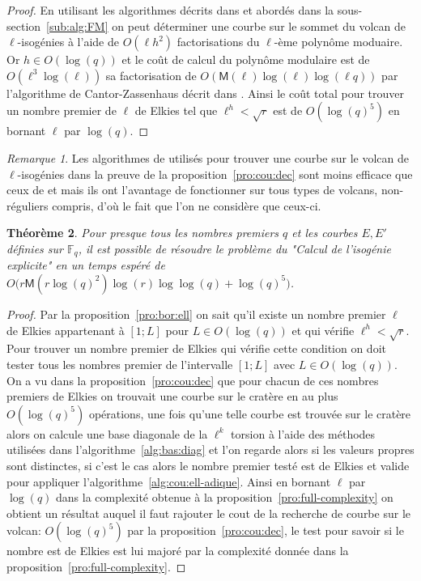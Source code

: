 \documentclass[10pt,a4paper]{book}
\theoremstyle{plain}
\newtheorem{thm}{Théorème}[chapter]
\theoremstyle{definition}
\theoremstyle{definition}
\theoremstyle{definition}
\theoremstyle{definition}
\theoremstyle{remark}
\newtheorem{rem}[thm]{Remarque}
\theoremstyle{remark}
\theoremstyle{definition}
\begin{document}
\begin{proof}
En utilisant les algorithmes décrits dans \cite{FouquetMorain02} et abordés 
dans la sous-section~\ref{sub:alg:FM} on peut déterminer une courbe sur le 
sommet du volcan de $\ell$-isogénies à l'aide de $O(\ell h^2)$ 
  factorisations du $\ell$-ème polynôme moduaire. Or $h \in O(\log(q))$ et
  le coût de calcul du polynôme modulaire est de $O(\ell^3\log(\ell))$ sa factorisation de 
  $O(\mathsf{M}(\ell)\log(\ell)\log(\ell q))$ par l'algorithme de 
  Cantor-Zassenhaus décrit dans \cite[Chapter~14.5]{vzGJG03}. Ainsi le coût 
  total pour trouver un nombre premier de $\ell$ de Elkies tel que $\ell^h<\sqrt{r}$  est de
  $O(\log(q)^5)$ en bornant $\ell$ par $\log(q)$.
	
\end{proof}

\begin{rem}
Les algorithmes de \cite{FouquetMorain02} utilisés pour trouver une courbe sur 
le volcan de $\ell$-isogénies  dans la preuve de la 
proposition~\ref{pro:cou:dec} sont moins efficace que ceux de 
\cite{Ionica-Joux10} et \cite{MiretMRV05} mais ils ont l'avantage de 
fonctionner sur tous types de volcans, non-réguliers compris, d'où le fait que
l'on ne considère que ceux-ci.
\end{rem}


\begin{thm}
Pour presque tous les nombres premiers $q$ et les courbes $E,E'$ définies sur 
$\mathbb{F}_q$, il est possible de résoudre le problème du "Calcul de l'isogénie explicite" 
en un temps espéré de $O \bigl( r \mathsf{M}(r\log(q)^2) \log(r) \log \log(q)  + \log(q)^5\bigr)$.

\end{thm}

\begin{proof}
Par la proposition~\ref{pro:bor:ell} on sait qu'il existe un nombre premier 
$\ell$ de Elkies appartenant à $[1;L]$ pour $L \in O(\log(q))$ et qui vérifie
$\ell^{h} < \sqrt{r}$. Pour trouver un nombre premier de Elkies qui vérifie 
cette condition on doit tester tous les nombres premier de l'intervalle $[1;L]$
avec $L \in O(\log(q))$. On a vu dans la proposition~\ref{pro:cou:dec} que pour 
chacun de ces nombres premiers de Elkies on trouvait une courbe sur le cratère
en au plus $O(\log(q)^5)$ opérations, une fois qu'une telle courbe est trouvée
sur le cratère alors on calcule une base diagonale de la $\ell^k$ torsion à 
l'aide des méthodes utilisées dans l'algorithme~\ref{alg:bas:diag} et l'on 
regarde alors si les valeurs propres sont distinctes, si c'est le cas alors le
nombre premier testé est de Elkies et valide pour appliquer 
l'algorithme~\ref{alg:cou:ell-adique}.
Ainsi en bornant $\ell$ par $\log(q)$ dans la complexité obtenue à la 
proposition~\ref{pro:full-complexity} on obtient un résultat auquel il faut 
rajouter le cout de la recherche de courbe sur le volcan: $O(\log(q)^5)$ par la 
proposition~\ref{pro:cou:dec}, le test pour savoir si le nombre est de Elkies 
est lui majoré par la complexité donnée dans la 
proposition~\ref{pro:full-complexity}.
\end{proof}
\end{document}
